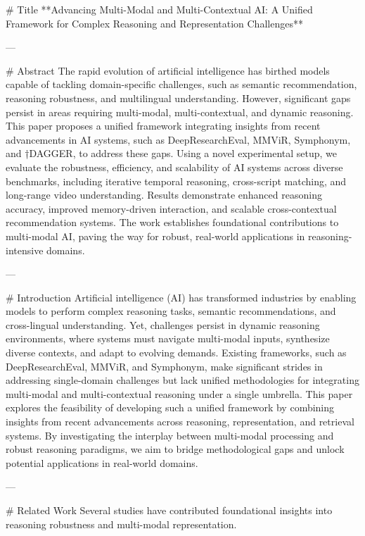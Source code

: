 # Title  
**Advancing Multi-Modal and Multi-Contextual AI: A Unified Framework for Complex Reasoning and Representation Challenges**

---

# Abstract  
The rapid evolution of artificial intelligence has birthed models capable of tackling domain-specific challenges, such as semantic recommendation, reasoning robustness, and multilingual understanding. However, significant gaps persist in areas requiring multi-modal, multi-contextual, and dynamic reasoning. This paper proposes a unified framework integrating insights from recent advancements in AI systems, such as DeepResearchEval, MMViR, Symphonym, and †DAGGER, to address these gaps. Using a novel experimental setup, we evaluate the robustness, efficiency, and scalability of AI systems across diverse benchmarks, including iterative temporal reasoning, cross-script matching, and long-range video understanding. Results demonstrate enhanced reasoning accuracy, improved memory-driven interaction, and scalable cross-contextual recommendation systems. The work establishes foundational contributions to multi-modal AI, paving the way for robust, real-world applications in reasoning-intensive domains.

---

# Introduction  
Artificial intelligence (AI) has transformed industries by enabling models to perform complex reasoning tasks, semantic recommendations, and cross-lingual understanding. Yet, challenges persist in dynamic reasoning environments, where systems must navigate multi-modal inputs, synthesize diverse contexts, and adapt to evolving demands. Existing frameworks, such as DeepResearchEval, MMViR, and Symphonym, make significant strides in addressing single-domain challenges but lack unified methodologies for integrating multi-modal and multi-contextual reasoning under a single umbrella. This paper explores the feasibility of developing such a unified framework by combining insights from recent advancements across reasoning, representation, and retrieval systems. By investigating the interplay between multi-modal processing and robust reasoning paradigms, we aim to bridge methodological gaps and unlock potential applications in real-world domains.

---

# Related Work  
Several studies have contributed foundational insights into reasoning robustness and multi-modal representation.  

